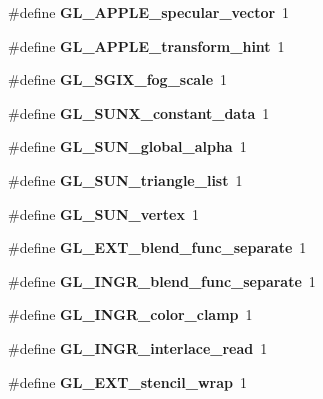 \begin{DoxyCompactItemize}
\item 
\#define {\bfseries G\+L\+\_\+\+A\+P\+P\+L\+E\+\_\+specular\+\_\+vector}~1\label{_s_d_l__opengl_8h_a3eb1a459f6b47d50c99f4eeb43927983}

\item 
\#define {\bfseries G\+L\+\_\+\+A\+P\+P\+L\+E\+\_\+transform\+\_\+hint}~1\label{_s_d_l__opengl_8h_a19651b8f5d3ccb06579e822d4602e079}

\item 
\#define {\bfseries G\+L\+\_\+\+S\+G\+I\+X\+\_\+fog\+\_\+scale}~1\label{_s_d_l__opengl_8h_ae8a68294d465e3f1b5b57747d5c5c9dd}

\item 
\#define {\bfseries G\+L\+\_\+\+S\+U\+N\+X\+\_\+constant\+\_\+data}~1\label{_s_d_l__opengl_8h_a80d1f0c4a24874a4d52bf738cf1c256c}

\item 
\#define {\bfseries G\+L\+\_\+\+S\+U\+N\+\_\+global\+\_\+alpha}~1\label{_s_d_l__opengl_8h_a4fdf89d7afac9ac54b6c24fc56f4b849}

\item 
\#define {\bfseries G\+L\+\_\+\+S\+U\+N\+\_\+triangle\+\_\+list}~1\label{_s_d_l__opengl_8h_a31ca9aa9a50f8dbd953a530863175f3b}

\item 
\#define {\bfseries G\+L\+\_\+\+S\+U\+N\+\_\+vertex}~1\label{_s_d_l__opengl_8h_afcd8fe488bd2d61c8da3e192b2d67406}

\item 
\#define {\bfseries G\+L\+\_\+\+E\+X\+T\+\_\+blend\+\_\+func\+\_\+separate}~1\label{_s_d_l__opengl_8h_a70773e54a4b2644ef2fb2ceb133f51cb}

\item 
\#define {\bfseries G\+L\+\_\+\+I\+N\+G\+R\+\_\+blend\+\_\+func\+\_\+separate}~1\label{_s_d_l__opengl_8h_af9d8cbd6d67bfe65ed81028b3c97f571}

\item 
\#define {\bfseries G\+L\+\_\+\+I\+N\+G\+R\+\_\+color\+\_\+clamp}~1\label{_s_d_l__opengl_8h_a6b9c995ee6c809f27c8f5a00d8905093}

\item 
\#define {\bfseries G\+L\+\_\+\+I\+N\+G\+R\+\_\+interlace\+\_\+read}~1\label{_s_d_l__opengl_8h_a18d2d401058825b6f3b867e075771162}

\item 
\#define {\bfseries G\+L\+\_\+\+E\+X\+T\+\_\+stencil\+\_\+wrap}~1\label{_s_d_l__opengl_8h_ac386f9931d26d122956d994c9943bf54}


\end{DoxyCompactItemize}

